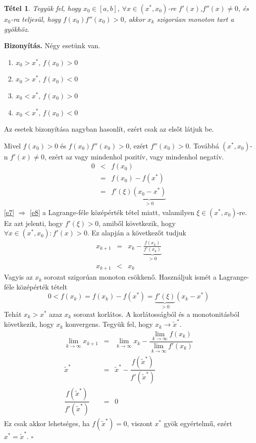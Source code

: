 \documentclass[a4paper,12pt]{report}
\newtheorem{Tet}{Tétel}[section]
\newenvironment{Biz}{\noindent \textbf{Bizonyítás. }}{ $\square$}
\begin{document}
			\begin{Tet}
				\label{t1}
				Tegyük fel, hogy $x_0\in [a,b]$, $\forall x \in (x^*,x_0)$-re $f'(x)$,$f''(x) \neq 0$, és $x_0$-ra teljesül, hogy $f(x_0)f''(x_0)>0$, akkor $x_k$ szigorúan monoton tart a gyökhöz.
			\end{Tet}
			\begin{Biz}
				Négy esetünk van.
				\begin{enumerate}
					\item $x_0>x^*$, $f(x_0)>0$
					\item $x_0>x^*$, $f(x_0)<0$
					\item $x_0<x^*$, $f(x_0)>0$
					\item $x_0<x^*$, $f(x_0)<0$
				\end{enumerate}
				Az esetek bizonyítása nagyban hasonlít, ezért csak az elsőt látjuk be.

                Mivel $f(x_0)>0$ és $f(x_0)f''(x_0)>0$, ezért $f''(x_0)>0$. Továbbá $(x^*,x_0)$-n $f'(x)\neq 0$, ezért az vagy mindenhol pozitív, vagy mindenhol negatív.
				\begin{eqnarray}
					\label{e6}0&<&f(x_0)\\
					\label{e7}&=&f(x_0)-f(x^*)\\
					\label{e8}&=&f'(\xi)\underbrace{(x_0-x^*)}_{>0}
				\end{eqnarray}
				\ref{e7} $\Rightarrow$ \ref{e8} a Lagrange-féle középérték tétel miatt, valamilyen $\xi \in (x^*,x_0)$-re. Ez azt jelenti, hogy $f'(\xi)>0$, amiből következik, hogy $\forall x\in (x^*,x_0): f'(x)>0$. Ez alapján a következőt tudjuk
				\begin{eqnarray*}
					x_{k+1}&=&x_k-\underbrace{\frac{f(x_k)}{f'(x_k)}}_{>0} \\
					x_{k+1}&<&x_k
				\end{eqnarray*}
				Vagyis az $x_k$ sorozat szigorúan monoton csökkenő. Használjuk ismét a Lagrange-féle középérték tételt
				\[0<f(x_k)=f(x_k)-f(x^*)=\underbrace{f'(\xi)}_{>0}(x_k-x^*)\]
				Tehát $x_k>x^*$ azaz $x_k$ sorozat korlátos. A korlátosságból és a monotonitásból következik, hogy $x_k$ konvergens. Tegyük fel, hogy $x_k\to \tilde{x}^*$.
				\begin{eqnarray*}
					\lim_{k \to \infty} x_{k+1} &=& \lim_{k \to \infty} x_k - \dfrac{\lim\limits_{k \to \infty} f(x_k)}{\lim\limits_{k \to \infty} f'(x_k)}\\
					\tilde{x}^*&=&\tilde{x}^*-\dfrac{f(\tilde{x}^*)}{f'(\tilde{x}^*)}\\
					\dfrac{f(\tilde{x}^*)}{f'(\tilde{x}^*)}&=&0
				\end{eqnarray*}
				Ez csak akkor lehetséges, ha $f(\tilde{x}^*)=0$, viszont $x^*$ gyök egyértelmű, ezért $x^*=\tilde{x}^*$.
			\end{Biz}
\end{document}
